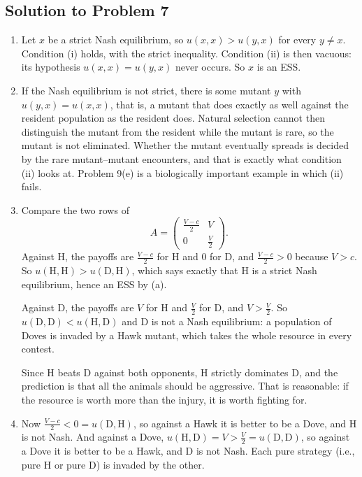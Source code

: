 \documentclass[a4paper,12pt]{article}
\begin{document}
\subsection*{Solution to Problem 7}

\begin{enumerate}[label=(\alph*)]
\item Let $x$ be a strict Nash equilibrium, so $u(x,x)>u(y,x)$ for every $y \neq x$. Condition (i) holds, with the strict inequality. Condition (ii) is then vacuous: its hypothesis $u(x,x)=u(y,x)$ never occurs. So $x$ is an ESS.

\item If the Nash equilibrium is not strict, there is some mutant $y$ with $u(y,x)=u(x,x)$, that is, a mutant that does exactly as well against the resident population as the resident does. Natural selection cannot then distinguish the mutant from the resident while the mutant is rare, so the mutant is not eliminated. Whether the mutant eventually spreads is decided by the rare mutant--mutant encounters, and that is exactly what condition (ii) looks at. Problem 9(e) is a biologically important example in which (ii) fails.

\item Compare the two rows of
\[ A = \begin{pmatrix} \frac{V-c}{2} & V\\[2pt] 0 & \frac{V}{2} \end{pmatrix} . \]
Against H, the payoffs are $\frac{V-c}{2}$ for H and $0$ for D, and $\frac{V-c}{2}>0$ because $V>c$. So $u(\text{H},\text{H})>u(\text{D},\text{H})$, which says exactly that H is a strict Nash equilibrium, hence an ESS by (a).

Against D, the payoffs are $V$ for H and $\frac{V}{2}$ for D, and $V>\frac{V}{2}$. So $u(\text{D},\text{D})<u(\text{H},\text{D})$ and D is not a Nash equilibrium: a population of Doves is invaded by a Hawk mutant, which takes the whole resource in every contest.

Since H beats D against both opponents, H strictly dominates D, and the prediction is that all the animals should be aggressive. That is reasonable: if the resource is worth more than the injury, it is worth fighting for.

\item Now $\frac{V-c}{2}<0 = u(\text{D},\text{H})$, so against a Hawk it is better to be a Dove, and H is not Nash. And against a Dove, $u(\text{H},\text{D})=V>\frac{V}{2}=u(\text{D},\text{D})$, so against a Dove it is better to be a Hawk, and D is not Nash. Each pure strategy (i.e., pure H or pure D) is invaded by the other.

\end{enumerate}
\end{document}
